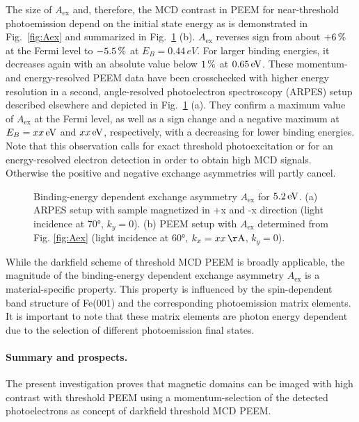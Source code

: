 \documentclass[prl,twocolumn,floatfix]{revtex4-2}
\newcommand{\com}[1]{{\color{magenta} #1}}
\begin{document}
The size of $A_{\mathrm{ex}}$ and, therefore, the MCD contrast in PEEM for near-threshold photoemission depend on the initial state energy as is demonstrated in Fig.~\ref{fig:Aex} and summarized in Fig.~\ref{fig:AexContrast} (b). $A_{\mathrm{ex}}$ reverses sign from about $\unit[+6]{\%}$ at the Fermi level to $\unit[-5.5]{\%}$ at $E_B= 0.44\,eV$. For larger binding energies, it decreases again with an absolute value below $\unit[1]{\%}$ at $\unit[0.65]{eV}$. These momentum- and energy-resolved PEEM data have been crosschecked  with higher energy resolution in a second, angle-resolved photoelectron spectroscopy (ARPES) setup described elsewhere \cite{gillmeister2018, gillmeister2020} and depicted in Fig.~\ref{fig:AexContrast} (a). They confirm a maximum value of $A_{\mathrm{ex}}$ at the Fermi level, as well as a sign change and a negative maximum at $E_B = \unit[xx]{eV}$ and $\unit[xx]{eV}$, respectively, with a decreasing for lower binding energies. Note that this observation calls for exact threshold photoexcitation or for an energy-resolved electron detection in order to obtain high MCD signals. Otherwise the positive and negative exchange asymmetries will partly cancel.
\begin{figure}
    \centering
    \caption{Binding-energy dependent exchange asymmetry $A_{\mathrm{ex}}$ for $\unit[5.2]{eV}$. (a) ARPES setup with sample magnetized in +x and -x direction (light incidence at 70°, $k_y = 0$). (b) PEEM setup with $A_{\mathrm{ex}}$ determined from Fig. \ref{fig:Aex} (light incidence at 60°, $k_x = \unit[xx]{\AA}$, $k_y = 0$).}
    \label{fig:AexContrast}
\end{figure}

\com{While the darkfield scheme of threshold MCD PEEM is broadly applicable, the magnitude of the binding-energy dependent exchange asymmetry $A_{\mathrm{ex}}$ is a material-specific property. This property is influenced by the spin-dependent band structure of Fe(001) and the corresponding photoemission matrix elements. It is important to note that these matrix elements are photon energy dependent due to the selection of different photoemission final states.}

\paragraph{Summary and prospects.} The present investigation proves that magnetic domains can be imaged with high contrast with threshold PEEM using a momentum-selection of the detected photoelectrons as concept of darkfield threshold MCD PEEM. 
\end{document}
